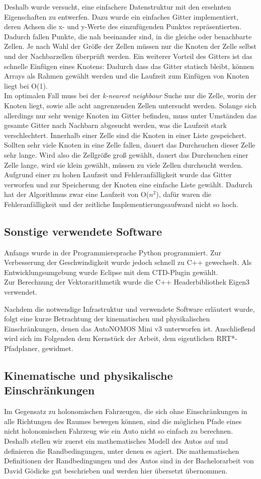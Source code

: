Deshalb wurde versucht, eine einfachere Datenstruktur mit den ersehnten Eigenschaften zu entwerfen. Dazu wurde ein einfaches Gitter implementiert, deren Achsen die x- und y-Werte des einzufügenden Punktes repräsentierten. Dadurch fallen Punkte, die nah beeinander sind, in die gleiche oder benachbarte Zellen. Je nach Wahl der Größe der Zellen müssen nur die Knoten der Zelle selbst und der Nachbarzellen überprüft werden. Ein weiterer Vorteil des Gitters ist das schnelle Einfügen eines Knotens: Dadurch dass das Gitter statisch bleibt, können Arrays als Rahmen gewählt werden und die Laufzeit zum Einfügen von Knoten liegt bei O(1).\\
Im optimalen Fall muss bei der \textit{k-nearest neighbour} Suche nur die Zelle, worin der Knoten liegt, sowie alle acht angrenzenden Zellen untersucht werden. Solange sich allerdings nur sehr wenige Knoten im Gitter befinden, muss unter Umständen das gesamte Gitter nach Nachbarn abgesucht werden, was die Laufzeit stark verschlechtert. Innerhalb einer Zelle sind die Knoten in einer Liste gespeichert. Sollten sehr viele Knoten in eine Zelle fallen, dauert das Durchsuchen dieser Zelle sehr lange. Wird also die Zellgröße groß gewählt, dauert das Durchsuchen einer Zelle lange, wird sie klein gewählt, müssen zu viele Zellen durchsucht werden. \\
Aufgrund einer zu hohen Laufzeit und Fehleranfälligkeit wurde das Gitter verworfen und zur Speicherung der Knoten eine einfache Liste gewählt. Dadurch hat der Algorithmus zwar eine Laufzeit von O($n^2$), dafür waren die Fehleranfälligkeit und der zeitliche Implementierungsaufwand nicht so hoch. \\
\subsection{Sonstige verwendete Software}
Anfangs wurde in der Programmiersprache Python programmiert. Zur Verbesserung der Geschwindigkeit wurde jedoch schnell zu C++ gewechselt. Als Entwicklungsumgebung wurde Eclipse mit dem CTD-Plugin gewählt. \\
Zur Berechnung der Vektorarithmetik wurde die C++ Headerbibliothek Eigen3 verwendet.

Nachdem die notwendige Infrastruktur und verwendete Software erläutert wurde, folgt eine kurze Betrachtung der kinematischen und physikalischen Einschränkungen, denen das AutoNOMOS Mini v3 unterworfen ist. Anschließend wird sich im Folgenden dem Kernstück der Arbeit, dem eigentlichen RRT*-Pfadplaner, gewidmet.
\subsection{Kinematische und physikalische Einschränkungen}
Im Gegensatz zu holonomischen Fahrzeugen, die sich ohne Einschränkungen in alle Richtungen des Raumes bewegen können, sind die möglichen Pfade eines nicht holonomischen Fahrzeug wie ein Auto nicht so einfach zu berechnen. Deshalb stellen wir zuerst ein mathematisches Modell des Autos auf und definieren die Randbedingungen, unter denen es agiert.
Die mathematischen Definitionen der Randbedingungen und des Autos sind in der Bachelorarbeit von David Gödicke \citep{Goedicke18} gut beschrieben und werden hier übersetzt übernommen. \\
